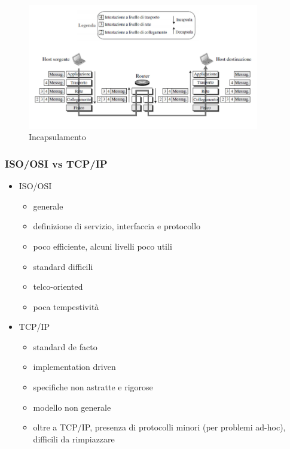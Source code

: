 \begin{figure}[H]
    \centering
    \includegraphics[width=0.9\textwidth]{immagini/Incapsulamento.png}
    \caption*{Incapsulamento}
\end{figure}

\subsubsection{ISO/OSI vs TCP/IP}

\begin{itemize}
    \item ISO/OSI
          \begin{itemize}
              \item generale
              \item definizione di servizio, interfaccia e protocollo
              \item poco efficiente, alcuni livelli poco utili
              \item standard difficili
              \item telco-oriented
              \item poca tempestività
          \end{itemize}
    \item TCP/IP
          \begin{itemize}
              \item standard de facto
              \item implementation driven
              \item specifiche non astratte e rigorose
              \item modello non generale
              \item oltre a TCP/IP, presenza di protocolli minori (per problemi ad-hoc), difficili da rimpiazzare
          \end{itemize}
\end{itemize}

